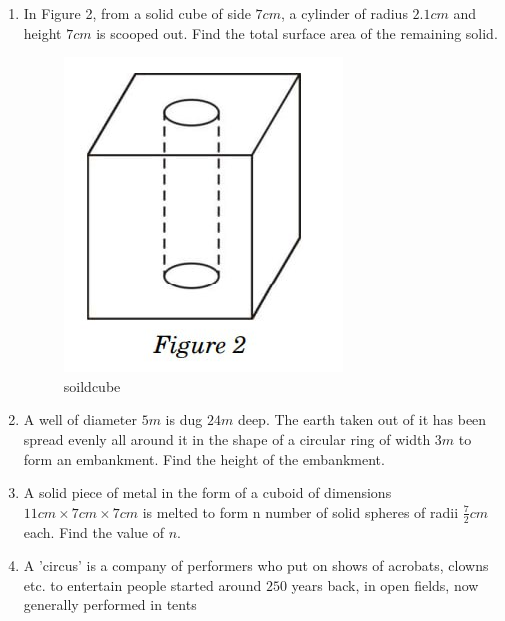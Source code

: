 \begin{enumerate}
\item  In Figure 2, from a solid cube of side $7 cm$, a cylinder of radius $2.1 cm$ and height $7 cm$ is scooped out. Find the total surface area of the remaining solid.
\begin{figure}[H]
\centering
\includegraphics[width=\columnwidth]{figs/solidcube4.png}
\caption{soildcube}
\label{fig:fig4}
\end{figure}

\item  A well of diameter $5 m$ is dug $24 m$ deep. The earth taken out of it has been spread evenly all around it in the shape of a circular ring of width $3 m$ to form an embankment. Find the height of the embankment.

 \item  A solid piece of metal in the form of a cuboid of dimensions $11 cm\times 7 cm\times 7 cm$ is melted to form n number of solid spheres of radii $\frac{7}{2}cm$ each. Find the value of $n$.

\item  A 'circus' is a company of performers who put on shows of acrobats, clowns etc. to entertain people started around $250$ years back, in open fields, now generally performed in tents


\end{enumerate}
